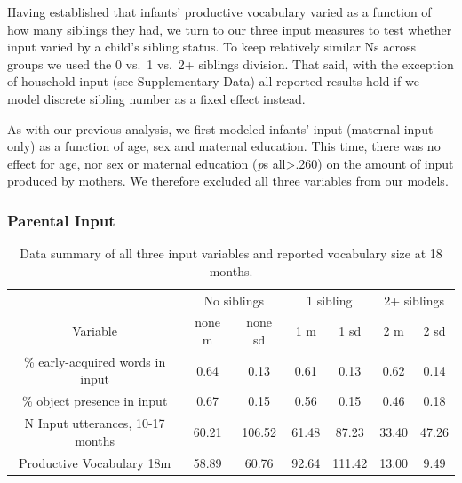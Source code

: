 \documentclass[
  english,
  man,floatsintext]{apa6}
\begin{document}
Having established that infants' productive vocabulary varied as a function of how many siblings they had, we turn to our three input measures to test whether input varied by a child's sibling status. To keep relatively similar Ns across groups we used the 0 vs.~1 vs.~2+ siblings division. That said, with the exception of household input (see Supplementary Data) all reported results hold if we model discrete sibling number as a fixed effect instead.

As with our previous analysis, we first modeled infants' input (maternal input only) as a function of age, sex and maternal education. This time, there was no effect for age, nor sex or maternal education (\emph{p}s all\textgreater.260) on the amount of input produced by mothers. We therefore excluded all three variables from our models.

\hypertarget{parental-input}{%
\subsubsection{Parental Input}\label{parental-input}}

\begin{table}

\caption{\label{tab:table-data-summary}Data summary of all three input variables and reported vocabulary size at 18 months.}
\centering
\begin{tabular}[t]{ccccccc}
\toprule
\multicolumn{1}{c}{ } & \multicolumn{2}{c}{No siblings} & \multicolumn{2}{c}{1 sibling} & \multicolumn{2}{c}{2+ siblings} \\
\cmidrule(l{3pt}r{3pt}){2-3} \cmidrule(l{3pt}r{3pt}){4-5} \cmidrule(l{3pt}r{3pt}){6-7}
Variable & none m & none sd & 1 m & 1 sd & 2 m & 2 sd\\
\midrule
\% early-acquired words in input & 0.64 & 0.13 & 0.61 & 0.13 & 0.62 & 0.14\\
\% object presence in input & 0.67 & 0.15 & 0.56 & 0.15 & 0.46 & 0.18\\
N Input utterances, 10-17 months & 60.21 & 106.52 & 61.48 & 87.23 & 33.40 & 47.26\\
Productive Vocabulary 18m & 58.89 & 60.76 & 92.64 & 111.42 & 13.00 & 9.49\\
\bottomrule
\end{tabular}
\end{table}
\end{document}

